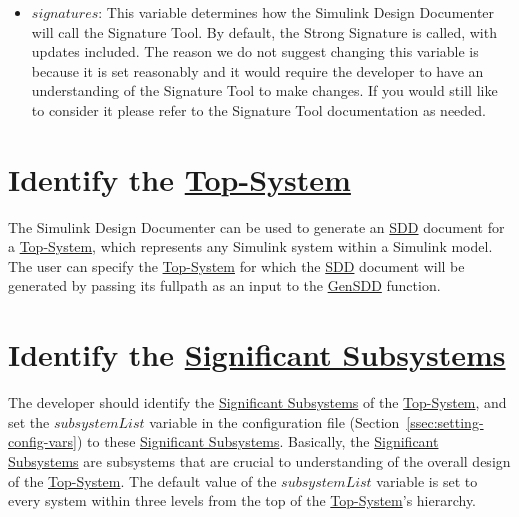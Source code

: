 \documentclass{mcscert}
\newcommand{\simulink}{Simulink}
\newcommand{\sigtool}{Signature Tool}
\newcommand{\sddtool}{Simulink Design Documenter}
\newcommand{\topsystemnolink}{Top-System} %
\newcommand{\topsystem}{\hyperref[def:topsystem]{\topsystemnolink{}}}
\newcommand{\sigsubsnolink}{Significant Subsystems} %
\newcommand{\sigsubs}{\hyperref[def:sigsubs]{\sigsubsnolink{}}}
\begin{document}
\begin{itemize}
		Unlike the removeInterfaceCols variable, by default this variable is set to include only the Block/Name and description columns as these tables list subsystems and the other columns are not very meaningful for subsystems. 
		The user may want to remove the description column if it is empty and they do not intend to provide descriptions. 
		Information can be added to these columns in the same way it is done for the columns in the interface sections (see Section~\ref{sec:interface-details}).
		\item $signatures$: 
		This variable determines how the \sddtool{} will call the \sigtool{}. 
		By default, the Strong Signature is called, with updates included. 
		The reason we do not suggest changing this variable is because it is set reasonably and it would require the developer to have an understanding of the \sigtool{} to make changes. 
		If you would still like to consider it please refer to the \sigtool{} documentation as needed. %
	\end{itemize}

\section{Identify the \topsystem{}}
\label{sec:decide-topsys}
The \sddtool{} can be used to generate an \hyperref[acr:sdd]{SDD} document for a \topsystem{}, which represents any \simulink{} system within a \simulink{} model. 
The user can specify the \topsystem{} for which the \hyperref[acr:sdd]{SDD} document will be generated by passing its fullpath as an input to the \hyperref[itm:call-gen-sdd]{GenSDD} function.

\section{Identify the \sigsubs{}}
\label{sec:indentify-sigsubs}
 The developer should identify the \sigsubs{} of the \topsystem{}, and set the $subsystemList$ variable in the configuration file (Section~\ref{ssec:setting-config-vars}) to these \sigsubs{}. 
 Basically, the \sigsubs{} are subsystems that	are crucial to understanding of the overall design of the \topsystem{}. 
 The default value of the $subsystemList$ variable is set to every system within three levels from the top of the \topsystem{}'s hierarchy.
 
\end{document}
